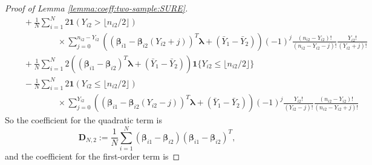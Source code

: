 \documentclass[12pt,letterpaper]{article}
\begin{document}
\begin{proof}[Proof of Lemma \ref{lemma:coeff:two-sample:SURE}]
\begin{equation}
\begin{array}{rl}
    &\displaystyle\quad+\frac{1}{N}\sum_{i=1}^N2\mathbf{1}(Y_{i2} > \lfloor n_{i2}/2\rfloor)\\
    &\displaystyle\quad\quad\quad\quad\quad\times\sum_{j=0}^{n_{i2}-Y_{i2}}\!\!\!\left((\boldsymbol{\beta}_{i1}-\boldsymbol{\beta}_{i2}(Y_{i2}+j))^T\boldsymbol{\lambda}+(\bar{Y}_1-\bar{Y}_2)\right)(-1)^{j}\frac{(n_{i2}-Y_{i2})!}{(n_{i2}-Y_{i2}-j)!}\frac{Y_{i2}!}{(Y_{i2}+j)!}\\
    &\displaystyle\quad+\frac{1}{N}\sum_{i=1}^N2\left((\boldsymbol{\beta}_{i1}-\boldsymbol{\beta}_{i2})^T\boldsymbol{\lambda}+(\bar{Y}_{1}-\bar{Y}_2)\right)\mathbf{1}\{Y_{i2}\leq \lfloor n_{i2}/2\rfloor\}\\
    &\displaystyle\quad-\frac{1}{N}\sum_{i=1}^N2\mathbf{1}(Y_{i2}\leq \lfloor n_{i2}/2\rfloor)\\
    &\displaystyle\quad\quad\quad\quad\quad\times\sum_{j=0}^{Y_{i2}}\left((\boldsymbol{\beta}_{i1}-\boldsymbol{\beta}_{i2}(Y_{i2}-j))^T\boldsymbol{\lambda}+(\bar{Y}_1-\bar{Y}_2)\right)(-1)^{j}\frac{Y_{i2}!}{(Y_{i2}-j)!}\frac{(n_{i2} - Y_{i2})!}{(n_{i2}-Y_{i2}+j)!}
\end{array}
\end{equation}
So the coefficient for the quadratic term is 
\begin{equation}\label{eq:coeff:quadratic:two-sample}
    \mathbf{D}_{N,2}:=\frac{1}{N}\sum_{i=1}^N(\boldsymbol{\beta}_{i1}-\boldsymbol{\beta}_{i2})(\boldsymbol{\beta}_{i1}-\boldsymbol{\beta}_{i2})^T,
\end{equation}
and the coefficient for the first-order term is 


\end{proof}
\end{document}

